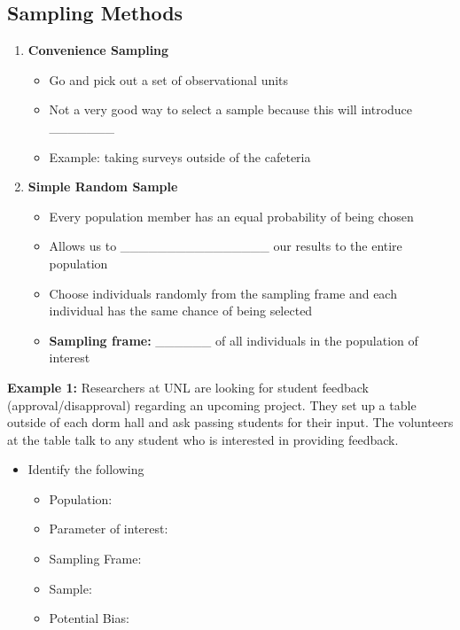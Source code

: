 \documentclass[
  letterpaper,
  DIV=11,
  numbers=noendperiod]{scrartcl}
\begin{document}
\subsection{Sampling Methods}\label{sampling-methods}

\begin{enumerate}
\def\labelenumi{\arabic{enumi}.}
\item
  \textbf{Convenience Sampling}

  \begin{itemize}
  \item
    Go and pick out a set of observational units
  \item
    Not a very good way to select a sample because this will introduce
    \_\_\_\_\_\_\_
  \item
    Example: taking surveys outside of the cafeteria
  \end{itemize}
\item
  \textbf{Simple Random Sample}

  \begin{itemize}
  \item
    Every population member has an equal probability of being chosen
  \item
    Allows us to \_\_\_\_\_\_\_\_\_\_\_\_\_\_\_\_ our results to the
    entire population
  \item
    Choose individuals randomly from the sampling frame and each
    individual has the same chance of being selected
  \item
    \textbf{Sampling frame:} \_\_\_\_\_\_ of all individuals in the
    population of interest
  \end{itemize}
\end{enumerate}

\textbf{Example 1:} Researchers at UNL are looking for student feedback
(approval/disapproval) regarding an upcoming project. They set up a
table outside of each dorm hall and ask passing students for their
input. The volunteers at the table talk to any student who is interested
in providing feedback.

\begin{itemize}
\item
  Identify the following

  \begin{itemize}
  \item
    Population:
  \item
    Parameter of interest:
  \item
    Sampling Frame:
  \item
    Sample:
  \item
    Potential Bias:
  \end{itemize}
\end{itemize}
\end{document}

